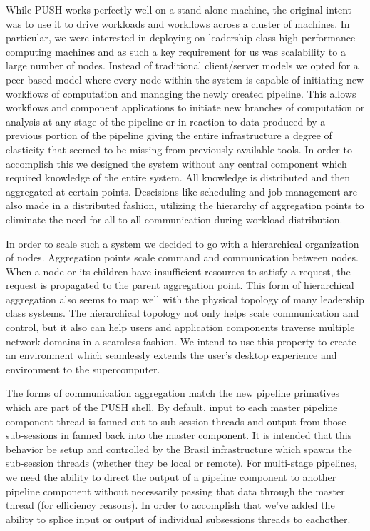 While PUSH works perfectly well on a stand-alone machine, the original
intent was to use it to drive workloads and workflows across a cluster of
machines.  In particular, we were interested in deploying on leadership
class high performance computing machines and as such
a key requirement for us was scalability to a large number of nodes.  
Instead of traditional client/server models we opted for a peer based
model where every node within the system is capable of initiating new
workflows of computation and managing the newly created pipeline.
This allows workflows and component applications to initiate new branches
of computation or analysis at any stage of the pipeline or in reaction to
data produced by a previous portion of the pipeline giving the entire
infrastructure a degree of elasticity that seemed to be missing from 
previously available tools.
In order to accomplish this we designed the system without any central
component which required knowledge of the entire system.
All knowledge is distributed and then aggregated at certain points.
Descisions like scheduling and job management are also made in a
distributed fashion, utilizing the hierarchy of aggregation points
to eliminate the need for all-to-all communication during workload
distribution.

In order to scale such a system we decided to go with a hierarchical
organization of nodes.  
Aggregation points scale command and communication between nodes.  
When a node or its children have insufficient resources to satisfy a request,
the request is propagated to the parent aggregation point.
This form of hierarchical aggregation also seems to map well with the 
physical topology of many leadership class systems.
The hierarchical topology not only helps scale communication and control,
but it also can help users and application components traverse multiple
network domains in a seamless fashion.
We intend to use this property to create an environment which seamlessly
extends the user's desktop experience and environment to the supercomputer.

The forms of communication aggregation match the new pipeline primatives 
which are part of the PUSH shell.
By default, input to each master pipeline component thread is fanned out 
to sub-session threads and output from those sub-sessions in fanned back
into the master component.
It is intended that this behavior be setup and controlled by the Brasil
infrastructure which spawns the sub-session threads (whether they be local
or remote).
For multi-stage pipelines, we need the ability to direct the output of
a pipeline component to another pipeline component without necessarily
passing that data through the master thread (for efficiency reasons).
In order to accomplish that we've added the ability to splice input or
output of individual subsessions threads to eachother.
